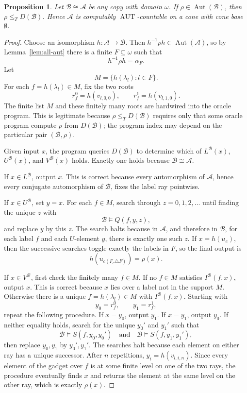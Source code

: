 \documentclass[12pt]{article}
\newtheorem{proposition}[theorem]{Proposition}
\theoremstyle{definition}
\theoremstyle{remark}
\newcommand{\Aut}{\operatorname{Aut}}
\begin{document}
\begin{proposition}\label{prop:copies}
Let \(\mathcal B\cong\mathcal A\) be any copy with domain \(\omega\).  If \(\rho\in\Aut(\mathcal B)\), then \(\rho\leq_T D(\mathcal B)\).  Hence \(\mathcal A\) is computably \(\operatorname{AUT}\)-countable on a cone with cone base \(\emptyset\).
\end{proposition}

\begin{proof}
Choose an isomorphism \(h:\mathcal A\to\mathcal B\).  Then \(h^{-1}\rho h\in\Aut(\mathcal A)\), so by Lemma~\ref{lem:all-aut} there is a finite \(F\subseteq\omega\) such that
\[
h^{-1}\rho h=\alpha_F.
\]
Let
\[
M=\{h(\lambda_l):l\in F\}.
\]
For each \(f=h(\lambda_l)\in M\), fix the two roots
\[
r_f^0=h(v_{l,0,0}),\qquad r_f^1=h(v_{l,1,0}).
\]
The finite list \(M\) and these finitely many roots are hardwired into the oracle program.  This is legitimate because \(\rho\leq_TD(\mathcal B)\) requires only that some oracle program compute \(\rho\) from \(D(\mathcal B)\); the program index may depend on the particular pair \((\mathcal B,\rho)\).

Given input \(x\), the program queries \(D(\mathcal B)\) to determine which of \(L^{\mathcal B}(x)\), \(U^{\mathcal B}(x)\), and \(V^{\mathcal B}(x)\) holds.  Exactly one holds because \(\mathcal B\cong\mathcal A\).

If \(x\in L^{\mathcal B}\), output \(x\).  This is correct because every automorphism of \(\mathcal A\), hence every conjugate automorphism of \(\mathcal B\), fixes the label ray pointwise.

If \(x\in U^{\mathcal B}\), set \(y=x\).  For each \(f\in M\), search through \(z=0,1,2,\ldots\) until finding the unique \(z\) with
\[
\mathcal B\models Q(f,y,z),
\]
and replace \(y\) by this \(z\).  The search halts because in \(\mathcal A\), and therefore in \(\mathcal B\), for each label \(f\) and each \(U\)-element \(y\), there is exactly one such \(z\).  If \(x=h(u_e)\), then the successive searches toggle exactly the labels in \(F\), so the final output is
\[
h(u_{c(F_e\triangle F)})=\rho(x).
\]

If \(x\in V^{\mathcal B}\), first check the finitely many \(f\in M\).  If no \(f\in M\) satisfies \(I^{\mathcal B}(f,x)\), output \(x\).  This is correct because \(x\) lies over a label not in the support \(M\).  Otherwise there is a unique \(f=h(\lambda_l)\in M\) with \(I^{\mathcal B}(f,x)\).  Starting with
\[
y_0=r_f^0,\qquad y_1=r_f^1,
\]
repeat the following procedure.  If \(x=y_0\), output \(y_1\).  If \(x=y_1\), output \(y_0\).  If neither equality holds, search for the unique \(y_0'\) and \(y_1'\) such that
\[
\mathcal B\models S(f,y_0,y_0')
\quad\text{and}\quad
\mathcal B\models S(f,y_1,y_1'),
\]
then replace \(y_0,y_1\) by \(y_0',y_1'\).  The searches halt because each element on either ray has a unique successor.  After \(n\) repetitions, \(y_i=h(v_{l,i,n})\).  Since every element of the gadget over \(f\) is at some finite level on one of the two rays, the procedure eventually finds \(x\) and returns the element at the same level on the other ray, which is exactly \(\rho(x)\).


\end{proof}
\end{document}
